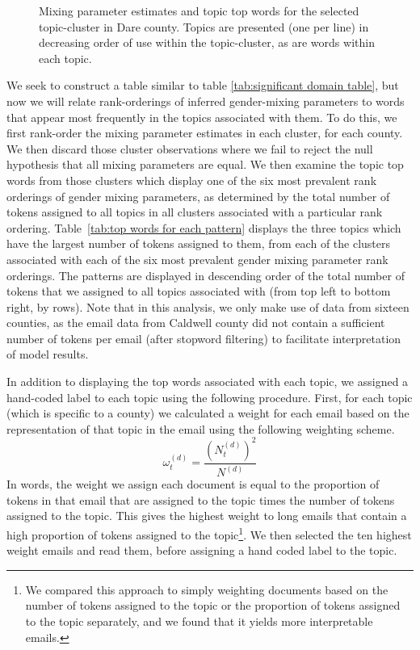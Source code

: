 \documentclass{pnastwo}
\begin{document}
\begin{article}
\begin{figure}
\begin{tabular}{m{}}
	\end{tabular}
	\caption{\label{tab: hoke 3 mp} Mixing parameter estimates and topic top words for the selected topic-cluster in Dare county. Topics are presented (one per line) in decreasing order of use within the topic-cluster, as are words within each topic.}
\end{figure}

We seek to construct a table similar to table \ref{tab:significant domain table}, but now we will relate rank-orderings of inferred gender-mixing parameters to words that appear most frequently in the topics associated with them. To do this, we first rank-order the mixing parameter estimates in each cluster, for each county. We then discard those cluster observations where we fail to reject the null hypothesis that all mixing parameters are equal. We then examine the topic top words from those clusters which display one of the six most prevalent rank orderings of gender mixing parameters, as determined by the total number of tokens assigned to all topics in all clusters associated with a particular rank ordering. Table~\ref{tab:top words for each pattern} displays the three topics which have the largest number of tokens assigned to them, from each of the clusters associated with each of the six most prevalent gender mixing parameter rank orderings. The patterns are displayed in descending order of the total number of tokens that we assigned to all topics associated with (from top left to bottom right, by rows). Note that in this analysis, we only make use of data from sixteen counties, as the email data from Caldwell county did not contain a sufficient number of tokens per email (after stopword filtering) to facilitate interpretation of model results.  

In addition to displaying the top words associated with each topic, we assigned a hand-coded label to each topic using the following procedure. First, for each topic (which is specific to a county) we calculated a weight for each email based on the representation of that topic in the email using the following weighting scheme.
\begin{equation}
	\omega_t^{(d)} = \frac{\left(N_t^{(d)}\right)^2}{N^{(d)}}
\end{equation}
In words, the weight we assign each document is equal to the proportion of tokens in that email that are assigned to the topic times the number of tokens assigned to the topic. This gives the highest weight to long emails that contain a high proportion of tokens assigned to the topic\footnote{We compared this approach to simply weighting documents based on the number of tokens assigned to the topic or the proportion of tokens assigned to the topic separately, and we found that it yields more interpretable emails.}. We then selected the ten highest weight emails and read them, before assigning a hand coded label to the topic.


\end{article}
\end{document}
